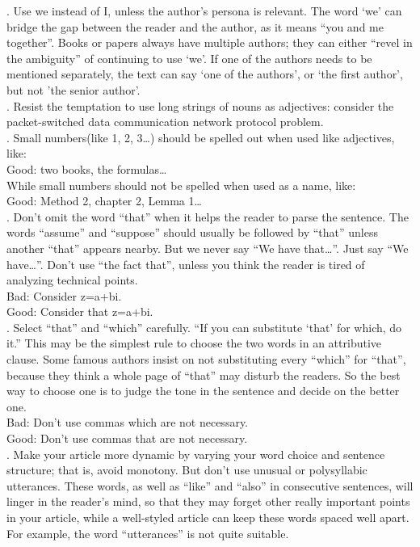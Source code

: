 \documentclass[12pt,a4paper]{article}  %
\theoremstyle{definition}
\numberwithin{equation}{section}
\begin{document}
. Use we instead of I, unless the author's persona is relevant. The word `we' can bridge the gap between the reader and the author, as it means ``you and me together''. Books or papers always have multiple authors; they can either ``revel in the ambiguity'' of continuing to use `we'. If one of the authors needs to be mentioned separately, the text can say `one of the authors', or `the first author', but not 'the senior author'. \\

. Resist the temptation to use long strings of nouns as adjectives:  consider the packet-switched data communication network protocol problem.\\

. Small numbers(like 1, 2, 3\dots) should be spelled out when used like adjectives, like: \\
\indent Good: two books, the formulas\dots\\
While small numbers should not be spelled when used as a name, like: \\
\indent Good: Method 2, chapter 2, Lemma 1\dots\\

. Don't omit the word ``that'' when it helps the reader to parse the sentence. The words ``assume'' and ``suppose'' should usually be followed by ``that'' unless another ``that'' appears nearby. But we never say ``We have that\dots''. Just say ``We have\dots''. Don't use ``the fact that'', unless you think the reader is tired of analyzing technical points.\\
\indent Bad: Consider z=a+bi.\\
\indent Good: Consider that z=a+bi.\\

. Select ``that'' and ``which'' carefully. ``If you can substitute `that' for which, do it.'' This may be the simplest rule to choose the two words in an attributive clause. Some famous authors insist on not substituting every ``which'' for ``that'', because they think a whole page of ``that'' may disturb the readers. So the best way to choose one is to judge the tone in the sentence and decide on the better one. \\
\indent Bad: Don't use commas which are not necessary. \\
\indent Good: Don't use commas that are not necessary. \\

. Make your article more dynamic by varying your word choice and sentence structure; that is, avoid monotony. But don't use unusual or polysyllabic utterances. These words, as well as ``like'' and ``also'' in consecutive sentences, will linger in the reader's mind, so that they may forget other really important points in your article, while a well-styled article can keep these words spaced well apart. For example, the word ``utterances'' is not quite suitable. \\
\end{document}
